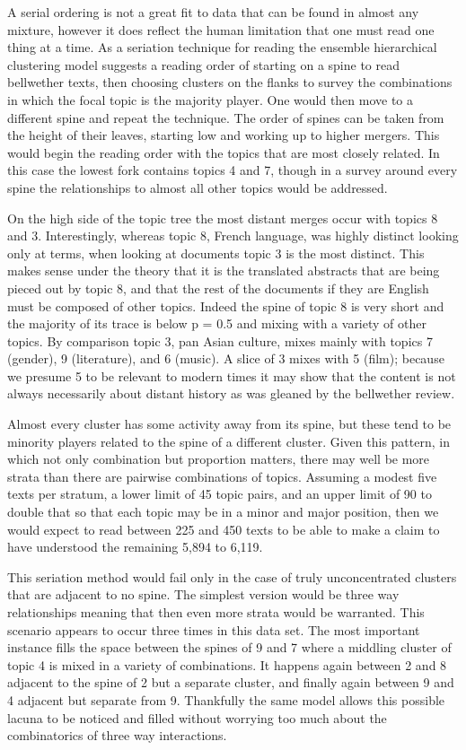 \documentclass[]{book}
\theoremstyle{definition}
\theoremstyle{definition}
\theoremstyle{definition}
\theoremstyle{remark}
\begin{document}
A serial ordering is not a great fit to data that can be found in almost
any mixture, however it does reflect the human limitation that one must
read one thing at a time. As a seriation technique for reading the
ensemble hierarchical clustering model suggests a reading order of
starting on a spine to read bellwether texts, then choosing clusters on
the flanks to survey the combinations in which the focal topic is the
majority player. One would then move to a different spine and repeat the
technique. The order of spines can be taken from the height of their
leaves, starting low and working up to higher mergers. This would begin
the reading order with the topics that are most closely related. In this
case the lowest fork contains topics 4 and 7, though in a survey around
every spine the relationships to almost all other topics would be
addressed.

On the high side of the topic tree the most distant merges occur with
topics 8 and 3. Interestingly, whereas topic 8, French language, was
highly distinct looking only at terms, when looking at documents topic 3
is the most distinct. This makes sense under the theory that it is the
translated abstracts that are being pieced out by topic 8, and that the
rest of the documents if they are English must be composed of other
topics. Indeed the spine of topic 8 is very short and the majority of
its trace is below p = 0.5 and mixing with a variety of other topics. By
comparison topic 3, pan Asian culture, mixes mainly with topics 7
(gender), 9 (literature), and 6 (music). A slice of 3 mixes with 5
(film); because we presume 5 to be relevant to modern times it may show
that the content is not always necessarily about distant history as was
gleaned by the bellwether review.

Almost every cluster has some activity away from its spine, but these
tend to be minority players related to the spine of a different cluster.
Given this pattern, in which not only combination but proportion
matters, there may well be more strata than there are pairwise
combinations of topics. Assuming a modest five texts per stratum, a
lower limit of 45 topic pairs, and an upper limit of 90 to double that
so that each topic may be in a minor and major position, then we would
expect to read between 225 and 450 texts to be able to make a claim to
have understood the remaining 5,894 to 6,119.

This seriation method would fail only in the case of truly
unconcentrated clusters that are adjacent to no spine. The simplest
version would be three way relationships meaning that then even more
strata would be warranted. This scenario appears to occur three times in
this data set. The most important instance fills the space between the
spines of 9 and 7 where a middling cluster of topic 4 is mixed in a
variety of combinations. It happens again between 2 and 8 adjacent to
the spine of 2 but a separate cluster, and finally again between 9 and 4
adjacent but separate from 9. Thankfully the same model allows this
possible lacuna to be noticed and filled without worrying too much about
the combinatorics of three way interactions.
\end{document}
